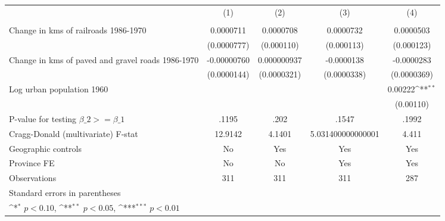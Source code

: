 {
\def\sym#1{\ifmmode^{#1}\else\(^{#1}\)\fi}
\begin{tabular}{l*{4}{c}}
\hline\hline
                &\multicolumn{1}{c}{(1)}&\multicolumn{1}{c}{(2)}&\multicolumn{1}{c}{(3)}&\multicolumn{1}{c}{(4)}\\
                &\multicolumn{1}{c}{}&\multicolumn{1}{c}{}&\multicolumn{1}{c}{}&\multicolumn{1}{c}{}\\
\hline
Change in kms of railroads 1986-1970&0.0000711         &0.0000708         &0.0000732         &0.0000503         \\
                &(0.0000777)         &(0.000110)         &(0.000113)         &(0.000123)         \\
[1em]
Change in kms of paved and gravel roads 1986-1970&-0.00000760         &0.000000937         &-0.0000138         &-0.0000283         \\
                &(0.0000144)         &(0.0000321)         &(0.0000338)         &(0.0000369)         \\
[1em]
Log urban population 1960&                  &                  &                  &  0.00222\sym{**} \\
                &                  &                  &                  &(0.00110)         \\
\hline
P-value for testing $\beta\_{2} >= \beta\_{1}$&    .1195         &     .202         &    .1547         &    .1992         \\
Cragg-Donald (multivariate) F-stat&  12.9142         &   4.1401         &5.031400000000001         &    4.411         \\
Geographic controls&       No         &      Yes         &      Yes         &      Yes         \\
Province FE     &       No         &       No         &      Yes         &      Yes         \\
Observations    &      311         &      311         &      311         &      287         \\
\hline\hline
\multicolumn{5}{l}{\footnotesize Standard errors in parentheses}\\
\multicolumn{5}{l}{\footnotesize \sym{*} \(p<0.10\), \sym{**} \(p<0.05\), \sym{***} \(p<0.01\)}\\
\end{tabular}
}
